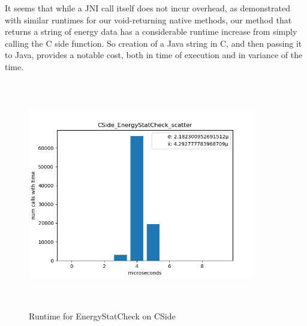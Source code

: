     It seems that while a JNI call itself does not incur overhead, as demonstrated with similar runtimes for our void-returning native methods, our method that returns a string of energy data has a considerable runtime increase from simply calling the C side function. So creation of a Java string in C, and then passing it to Java, provides a notable cost, both in time of execution and in variance of the time. 
    
    
    \begin{figure}[H]
	    \centering
	    \includegraphics[width=10cm,height=10cm,keepaspectratio]{jmh/jni-overhead/CSide_EnergyStatCheck_scatter.png}
	    \caption{Runtime for EnergyStatCheck on CSide}
	    \label{fig:jolteon-jmh-runtime-energystatcheck-c}
    \end{figure}
